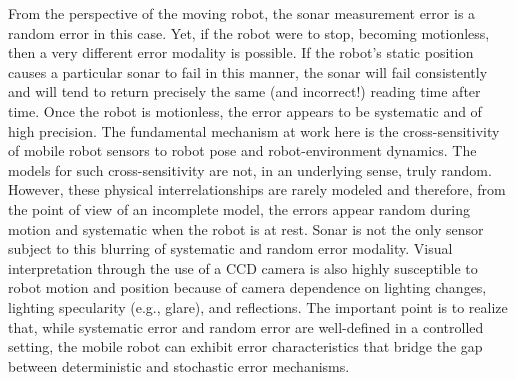 From the perspective of the moving robot, the
sonar measurement error is a random error in this case. Yet, if the robot were to stop,
becoming motionless, then a very different error modality is possible. If the robot’s static
position causes a particular sonar to fail in this manner, the sonar will fail consistently and
will tend to return precisely the same (and incorrect!) reading time after time. Once the
robot is motionless, the error appears to be systematic and of high precision.
The fundamental mechanism at work here is the cross-sensitivity of mobile robot sensors to robot
pose and robot-environment dynamics. The models for such cross-sensitivity
are not, in an underlying sense, truly random. However, these physical interrelationships
are rarely modeled and therefore, from the point of view of an incomplete model, the errors
appear random during motion and systematic when the robot is at rest.
Sonar is not the only sensor subject to this blurring of systematic and random error
modality. Visual interpretation through the use of a CCD camera is also highly susceptible
to robot motion and position because of camera dependence on lighting changes, lighting
specularity (e.g., glare), and reflections. The important point is to realize that, while 
systematic error and random error are well-defined in a controlled setting, the mobile robot can
exhibit error characteristics that bridge the gap between deterministic and stochastic error
mechanisms.

